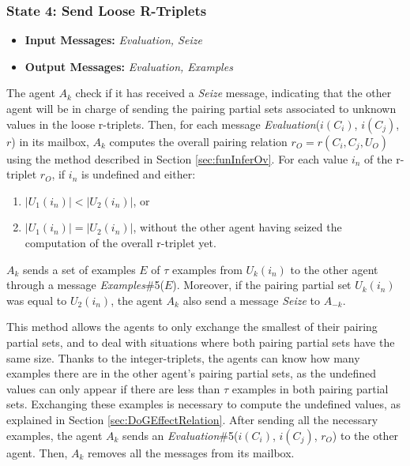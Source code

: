 \subsubsection{State 4: Send Loose R-Triplets}

\begin{itemize}
    \item \textbf{Input Messages:} \emph{Evaluation, Seize}
    \item \textbf{Output Messages:} \emph{Evaluation, Examples}
\end{itemize}

The agent $A_{k}$ check if it has received a \emph{Seize} message, indicating that the other agent will be in charge of sending the pairing partial sets associated to unknown values in the loose r-triplets. Then, for each message \emph{Evaluation}($i(C_{i})$, $i(C_{j})$, $r$) in its mailbox, $A_{k}$ computes the overall pairing relation $r_{O} =  r(C_{i}, C_{j}, U_{O})$ using the method described in Section \ref{sec:funInferOv}. For each value $i_{n}$ of the r-triplet $r_{O}$, if $i_{n}$ is undefined and either:

\begin{enumerate}
    \item $|U_{1}(i_{n})| < |U_{2}(i_{n})|$, or
    \item $|U_{1}(i_{n})| = |U_{2}(i_{n})|$, without the other agent having seized the computation of the overall r-triplet yet.
\end{enumerate}

$A_{k}$ sends a set of examples $E$ of $\tau$ examples from $U_{k}(i_{n})$ to the other agent through a message \emph{Examples}\#5($E$). Moreover, if the pairing partial set $U_{k}(i_{n})$ was equal to  $U_{2}(i_{n})$, the agent $A_{k}$ also send a message \emph{Seize} to $A_{-k}$.

This method allows the agents to only exchange the smallest of their pairing partial sets, and to deal with situations where both pairing partial sets have the same size. Thanks to the integer-triplets, the agents can know how many examples there are in the other agent's pairing partial sets, as the undefined values can only appear if there are less than $\tau$ examples in both pairing partial sets. Exchanging these examples is necessary to compute the undefined values, as explained in Section \ref{sec:DoGEffectRelation}. After sending all the necessary examples, the agent $A_{k}$ sends an \emph{Evaluation}\#5($i(C_{i})$, $i(C_{j})$, $r_{O}$) to the other agent. Then, $A_{k}$ removes all the messages from its mailbox.

